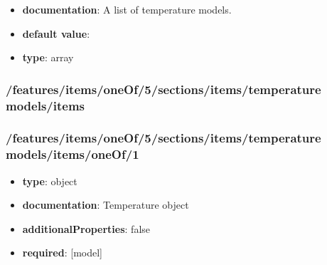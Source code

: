 \begin{itemize}\item {\bf documentation}: A list of temperature models.
\item {\bf default value}: 
\item {\bf type}: array
\end{itemize}\subsubsection{/features/items/oneOf/5/sections/items/temperature models/items}

\subsubsection{/features/items/oneOf/5/sections/items/temperature models/items/oneOf/1}
\begin{itemize}\item {\bf type}: object
\item {\bf documentation}: Temperature object
\item {\bf additionalProperties}: false
\item {\bf required}: [model]\end{itemize}

